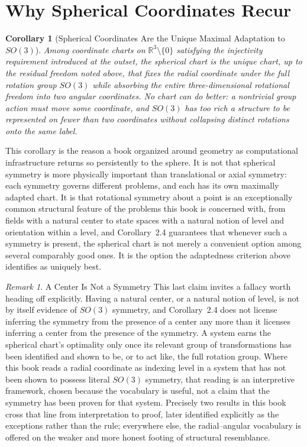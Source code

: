 \documentclass[11pt,fleqn]{book}
\numberwithin{equation}{chapter}
\theoremstyle{plain}
\newtheorem{corollary}[theorem]{Corollary}
\theoremstyle{definition}
\theoremstyle{remark}
\newtheorem{remark}[theorem]{Remark}
\newcommand{\R}{\mathbb{R}}
\begin{document}
\section{Why Spherical Coordinates Recur}

\begin{corollary}[Spherical Coordinates Are the Unique Maximal Adaptation to \(SO(3)\)]
Among coordinate charts on \(\R^3\setminus\{0\}\) satisfying the injectivity requirement introduced at the outset, the spherical chart is the unique chart, up to the residual freedom noted above, that fixes the radial coordinate under the full rotation group \(SO(3)\) while absorbing the entire three-dimensional rotational freedom into two angular coordinates. No chart can do better: a nontrivial group action must move some coordinate, and \(SO(3)\) has too rich a structure to be represented on fewer than two coordinates without collapsing distinct rotations onto the same label.
\end{corollary}

This corollary is the reason a book organized around geometry as computational infrastructure returns so persistently to the sphere. It is not that spherical symmetry is more physically important than translational or axial symmetry: each symmetry governs different problems, and each has its own maximally adapted chart. It is that rotational symmetry about a point is an exceptionally common structural feature of the problems this book is concerned with, from fields with a natural center to state spaces with a natural notion of level and orientation within a level, and Corollary~2.4 guarantees that whenever such a symmetry is present, the spherical chart is not merely a convenient option among several comparably good ones. It is the option the adaptedness criterion above identifies as uniquely best.

\begin{remark}{A Center Is Not a Symmetry}
This last claim invites a fallacy worth heading off explicitly. Having a natural center, or a natural notion of level, is not by itself evidence of \(SO(3)\) symmetry, and Corollary~2.4 does not license inferring the symmetry from the presence of a center any more than it licenses inferring a center from the presence of the symmetry. A system earns the spherical chart's optimality only once its relevant group of transformations has been identified and shown to be, or to act like, the full rotation group. Where this book reads a radial coordinate as indexing level in a system that has not been shown to possess literal \(SO(3)\) symmetry, that reading is an interpretive framework, chosen because the vocabulary is useful, not a claim that the symmetry has been proven for that system. Precisely two results in this book cross that line from interpretation to proof, later identified explicitly as the exceptions rather than the rule; everywhere else, the radial--angular vocabulary is offered on the weaker and more honest footing of structural resemblance.
\end{remark}
\end{document}
